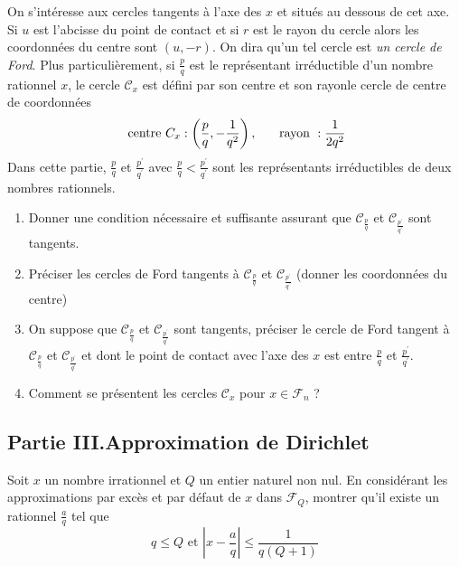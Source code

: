 On s'int{\'e}resse aux cercles tangents {\`a} l'axe des $x$ et situ{\'e}s au dessous de cet axe. Si $u$ est l'abcisse du point de contact et si $r$ est le rayon du cercle alors les coordonn{\'e}es du centre sont $(u,-r)$.\newline
On dira qu'un tel cercle est \emph{un cercle de Ford}.\newline
Plus particuli{\`e}rement, si $\frac{p}{q}$ est le repr{\'e}sentant irr{\'e}ductible d'un nombre rationnel $x$, le cercle  $\mathcal{C}_{x}$ est défini par son centre et son rayonle cercle de centre de coordonn{\'e}es
\begin{displaymath}
\text{ centre } C_{x}: \left( \frac{p}{q}, -\frac{1}{q^2}\right), \hspace{0.5cm}\text{ rayon }: \frac{1}{2q^{2}}
\end{displaymath}
Dans cette partie, $\frac{p}{q}$ et $\frac{p^{\prime }}{q^{\prime }}$ avec $\frac{p}{q}<\frac{p^{\prime }}{q^{\prime }}$ sont les repr{\'e}sentants irr{\'e}ductibles de deux nombres rationnels.
\begin{enumerate}
\item  Donner une condition n{\'e}cessaire et suffisante assurant que $\mathcal{C}_{\frac{p}{q}}$ et $\mathcal{C}_{\frac{p^{\prime }}{q^{\prime }}}$ sont tangents.

\item  Pr{\'e}ciser les cercles de Ford tangents {\`a} $\mathcal{C}_{\frac{p}{q}}$ et $\mathcal{C}_{\frac{p^{\prime }}{q^{\prime }}}$ (donner les coordonn{\'e}es du centre)

\item  On suppose que $\mathcal{C}_{\frac{p}{q}}$ et $\mathcal{C}_{\frac{p^{\prime }}{q^{\prime }}}$ sont tangents, pr{\'e}ciser le cercle de Ford tangent {\`a} $\mathcal{C}_{\frac{p}{q}}$ et $\mathcal{C}_{\frac{p^{\prime }}{q^{\prime }}}$ et dont le point de contact avec l'axe des $x$ est entre $\frac{p}{q}$ et $\frac{p^{\prime }}{q^{\prime }}$.

\item  Comment se pr{\'e}sentent les cercles $\mathcal{C}_{x}$ pour $x\in \mathcal{F}_{n}$ ?
\end{enumerate}

\subsection*{Partie III.\quad Approximation de Dirichlet}
Soit $x$ un nombre irrationnel et $Q$ un entier naturel non nul. En consid{\'e}rant les approximations par exc{\`e}s et par d{\'e}faut de $x$ dans $\mathcal{F}_{Q}$, montrer qu'il existe un rationnel $\frac{a}{q}$ tel que
\[
q\leq Q\text{ et }\left| x-\frac{a}{q}\right| \leq \frac{1}{q(Q+1)}
\]
